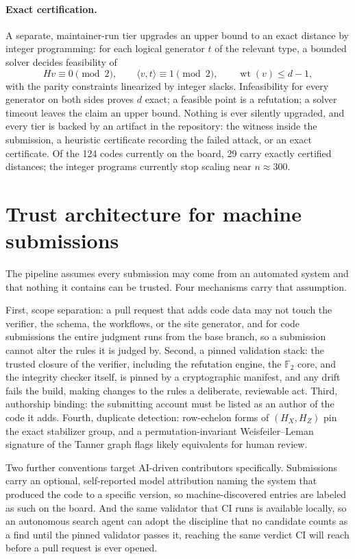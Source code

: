\documentclass{ceurart}
\newcommand{\GF}{\mathbb{F}_2}
\newcommand{\HX}{H_X}
\newcommand{\HZ}{H_Z}
\newcommand{\wt}{\operatorname{wt}}
\begin{document}
\paragraph{Exact certification.} A separate, maintainer-run tier upgrades an
upper bound to an exact distance by integer programming: for each logical
generator $t$ of the relevant type, a bounded solver decides feasibility of
\begin{equation}
    H v \equiv 0 \pmod 2, \qquad
    \langle v, t\rangle \equiv 1 \pmod 2, \qquad
    \wt(v) \le d-1,
\end{equation}
with the parity constraints linearized by integer slacks. Infeasibility for
every generator on both sides proves $d$ exact; a feasible point is a
refutation; a solver timeout leaves the claim an upper bound.
Nothing is ever silently upgraded, and every tier is backed by an artifact in
the repository: the witness inside the submission, a heuristic certificate
recording the failed attack, or an exact certificate. Of the 124 codes
currently on the board, 29 carry exactly certified distances; the integer
programs currently stop scaling near $n\approx 300$.

\section{Trust architecture for machine submissions}

The pipeline assumes every submission may come from an automated system and
that nothing it contains can be trusted. Four mechanisms carry that
assumption.

First, scope separation: a pull request that adds code data may not touch the
verifier, the schema, the workflows, or the site generator, and for code
submissions the entire judgment runs from the base branch, so a submission
cannot alter the rules it is judged by. Second, a pinned validation stack:
the trusted closure of the verifier, including the refutation engine, the
$\GF$ core, and the integrity checker itself, is pinned by a cryptographic
manifest, and any drift fails the build, making changes to the rules a
deliberate, reviewable act. Third, authorship binding: the submitting account
must be listed as an author of the code it adds. Fourth, duplicate detection:
row-echelon forms of $(\HX,\HZ)$ pin the exact stabilizer group, and a
permutation-invariant Weisfeiler--Leman signature of the Tanner graph flags
likely equivalents for human review.

Two further conventions target AI-driven contributors specifically.
Submissions carry an optional, self-reported model attribution naming the
system that produced the code to a specific version, so machine-discovered
entries are labeled as such on the board. And the same validator that CI runs
is available locally, so an autonomous search agent can adopt the discipline
that no candidate counts as a find until the pinned validator passes it,
reaching the same verdict CI will reach before a pull request is ever opened.
\end{document}
